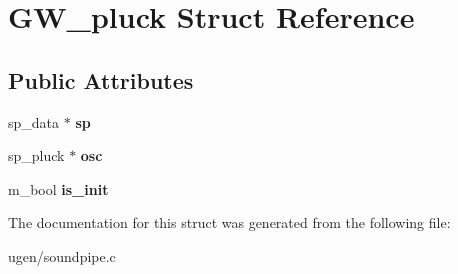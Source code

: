 \hypertarget{structGW__pluck}{}\section{G\+W\+\_\+pluck Struct Reference}
\label{structGW__pluck}
\subsection*{Public Attributes}
\begin{DoxyCompactItemize}
\item 
\hypertarget{structGW__pluck_a41b1711049804d98561163e9fff729e4}{}\label{structGW__pluck_a41b1711049804d98561163e9fff729e4} 
sp\+\_\+data $\ast$ {\bfseries sp}
\item 
\hypertarget{structGW__pluck_a2cb32fc6953b2a6c66fff489f2edb606}{}\label{structGW__pluck_a2cb32fc6953b2a6c66fff489f2edb606} 
sp\+\_\+pluck $\ast$ {\bfseries osc}
\item 
\hypertarget{structGW__pluck_a52c8e76346503585ae46ebc8ea7904d6}{}\label{structGW__pluck_a52c8e76346503585ae46ebc8ea7904d6} 
m\+\_\+bool {\bfseries is\+\_\+init}
\end{DoxyCompactItemize}


The documentation for this struct was generated from the following file\+:\begin{DoxyCompactItemize}
\item 
ugen/soundpipe.\+c\end{DoxyCompactItemize}
